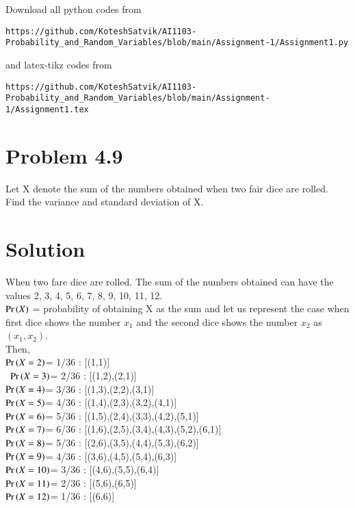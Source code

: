 \documentclass[journal,12pt,twocolumn]{IEEEtran}
\begin{document}
\author{Songa Kotesh Satvik}
\maketitle
\newpage
\bigskip
\renewcommand{\thefigure}{\theenumi}
\renewcommand{\thetable}{\theenumi}
Download all python codes from 
\begin{lstlisting}
https://github.com/KoteshSatvik/AI1103-Probability_and_Random_Variables/blob/main/Assignment-1/Assignment1.py
\end{lstlisting}
%
and latex-tikz codes from 
%
\begin{lstlisting}
https://github.com/KoteshSatvik/AI1103-Probability_and_Random_Variables/blob/main/Assignment-1/Assignment1.tex
\end{lstlisting}
\section{Problem 4.9}
Let X denote the sum of the numbers obtained when two fair dice are rolled. Find the variance and standard deviation of X.
\section{Solution}
 When two fare dice are rolled. The sum of the numbers obtained can have the values 2, 3, 4, 5, 6, 7, 8, 9, 10, 11, 12.\\
$\Pr\left(X\right)$ = probability of obtaining X as the sum and let us represent the case when first dice shows the number $x_1$ and the second dice shows the number $x_2$ as $(x_1,x_2)$.\\
Then,\\
$\Pr\left(X=2\right)$= 1/36 : [(1,1)]\\\
$\Pr\left(X=3\right)$= 2/36 : [(1,2),(2,1)]\\
$\Pr\left(X=4\right)$= 3/36 : [(1,3),(2,2),(3,1)]\\
$\Pr\left(X=5\right)$= 4/36 : [(1,4),(2,3),(3,2),(4,1)]\\
$\Pr\left(X=6\right)$= 5/36 : [(1,5),(2,4),(3,3),(4,2),(5,1)]\\
$\Pr\left(X=7\right)$= 6/36 : [(1,6),(2,5),(3,4),(4,3),(5,2),(6,1)]\\
$\Pr\left(X=8\right)$= 5/36 : [(2,6),(3,5),(4,4),(5,3),(6,2)]\\
$\Pr\left(X=9\right)$= 4/36 : [(3,6),(4,5),(5,4),(6,3)]\\
$\Pr\left(X=10\right)$= 3/36 : [(4,6),(5,5),(6,4)]\\
$\Pr\left(X=11\right)$= 2/36 : [(5,6),(6,5)]\\
$\Pr\left(X=12\right)$= 1/36 : [(6,6)]\\
\end{document}
